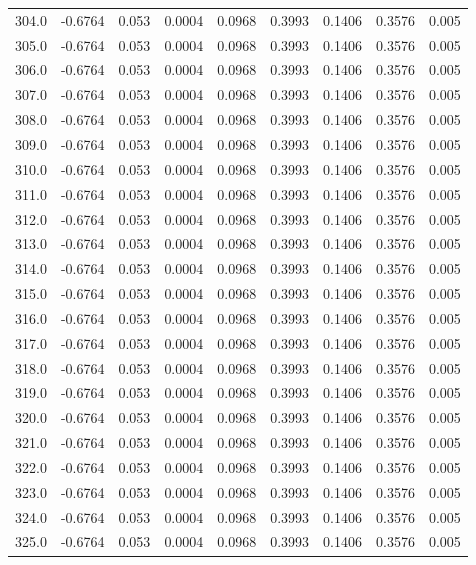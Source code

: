 \begin{longtable}{lrrrrrrrr}
304.0 & -0.6764 & 0.053 & 0.0004 & 0.0968 & 0.3993 & 0.1406 & 0.3576 & 0.005 \\
305.0 & -0.6764 & 0.053 & 0.0004 & 0.0968 & 0.3993 & 0.1406 & 0.3576 & 0.005 \\
306.0 & -0.6764 & 0.053 & 0.0004 & 0.0968 & 0.3993 & 0.1406 & 0.3576 & 0.005 \\
307.0 & -0.6764 & 0.053 & 0.0004 & 0.0968 & 0.3993 & 0.1406 & 0.3576 & 0.005 \\
308.0 & -0.6764 & 0.053 & 0.0004 & 0.0968 & 0.3993 & 0.1406 & 0.3576 & 0.005 \\
309.0 & -0.6764 & 0.053 & 0.0004 & 0.0968 & 0.3993 & 0.1406 & 0.3576 & 0.005 \\
310.0 & -0.6764 & 0.053 & 0.0004 & 0.0968 & 0.3993 & 0.1406 & 0.3576 & 0.005 \\
311.0 & -0.6764 & 0.053 & 0.0004 & 0.0968 & 0.3993 & 0.1406 & 0.3576 & 0.005 \\
312.0 & -0.6764 & 0.053 & 0.0004 & 0.0968 & 0.3993 & 0.1406 & 0.3576 & 0.005 \\
313.0 & -0.6764 & 0.053 & 0.0004 & 0.0968 & 0.3993 & 0.1406 & 0.3576 & 0.005 \\
314.0 & -0.6764 & 0.053 & 0.0004 & 0.0968 & 0.3993 & 0.1406 & 0.3576 & 0.005 \\
315.0 & -0.6764 & 0.053 & 0.0004 & 0.0968 & 0.3993 & 0.1406 & 0.3576 & 0.005 \\
316.0 & -0.6764 & 0.053 & 0.0004 & 0.0968 & 0.3993 & 0.1406 & 0.3576 & 0.005 \\
317.0 & -0.6764 & 0.053 & 0.0004 & 0.0968 & 0.3993 & 0.1406 & 0.3576 & 0.005 \\
318.0 & -0.6764 & 0.053 & 0.0004 & 0.0968 & 0.3993 & 0.1406 & 0.3576 & 0.005 \\
319.0 & -0.6764 & 0.053 & 0.0004 & 0.0968 & 0.3993 & 0.1406 & 0.3576 & 0.005 \\
320.0 & -0.6764 & 0.053 & 0.0004 & 0.0968 & 0.3993 & 0.1406 & 0.3576 & 0.005 \\
321.0 & -0.6764 & 0.053 & 0.0004 & 0.0968 & 0.3993 & 0.1406 & 0.3576 & 0.005 \\
322.0 & -0.6764 & 0.053 & 0.0004 & 0.0968 & 0.3993 & 0.1406 & 0.3576 & 0.005 \\
323.0 & -0.6764 & 0.053 & 0.0004 & 0.0968 & 0.3993 & 0.1406 & 0.3576 & 0.005 \\
324.0 & -0.6764 & 0.053 & 0.0004 & 0.0968 & 0.3993 & 0.1406 & 0.3576 & 0.005 \\
325.0 & -0.6764 & 0.053 & 0.0004 & 0.0968 & 0.3993 & 0.1406 & 0.3576 & 0.005 \\

\end{longtable}
